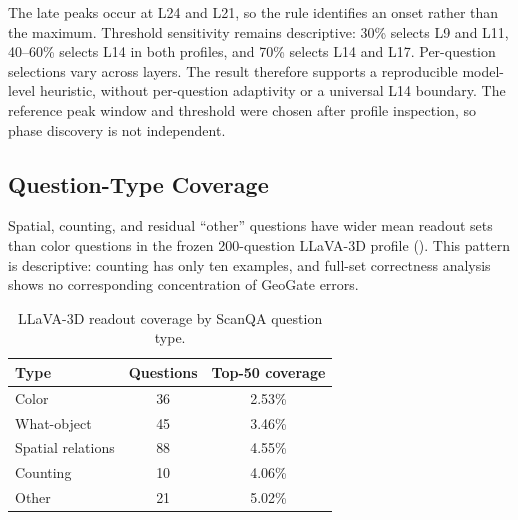 The late peaks occur at L24 and L21, so the rule identifies an onset rather than the maximum. Threshold sensitivity remains descriptive: 30\% selects L9 and L11, 40--60\% selects L14 in both profiles, and 70\% selects L14 and L17. Per-question selections vary across layers. The result therefore supports a reproducible model-level heuristic, without per-question adaptivity or a universal L14 boundary. The reference peak window and threshold were chosen after profile inspection, so phase discovery is not independent.

\subsection{Question-Type Coverage}
Spatial, counting, and residual ``other'' questions have wider mean readout sets than color questions in the frozen 200-question LLaVA-3D profile (). This pattern is descriptive: counting has only ten examples, and full-set correctness analysis shows no corresponding concentration of GeoGate errors.

\begin{table}[t]
\centering
\caption{LLaVA-3D readout coverage by ScanQA question type.}
\label{tab:supp_qtype}
\begin{tabular}{lcc}
\toprule
Type & Questions & Top-50 coverage \\
\midrule
Color & 36 & 2.53\% \\
What-object & 45 & 3.46\% \\
Spatial relations & 88 & 4.55\% \\
Counting & 10 & 4.06\% \\
Other & 21 & 5.02\% \\
\bottomrule
\end{tabular}
\end{table}
